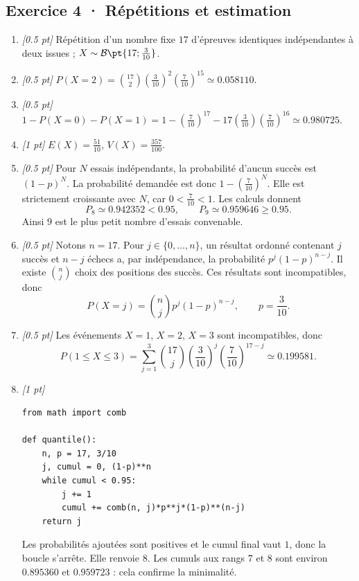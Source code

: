 \subsection*{Exercice 4 · Répétitions et estimation}\begin{enumerate}

\item \textit{[\num{0,5} pt]} Répétition d'un nombre fixe $17$ d'épreuves identiques indépendantes à deux issues ; $X\sim\mathcal B\pt{17;\frac{3}{10}}$.

\item \textit{[\num{0,5} pt]} $P(X=2)=\binom{17}2(\frac{3}{10})^2(\frac{7}{10})^{15}\simeq\num{0,058110}$.

\item \textit{[\num{0,5} pt]} $1-P(X=0)-P(X=1)=1-(\frac{7}{10})^{17}-17(\frac{3}{10})(\frac{7}{10})^{16}\simeq\num{0,980725}$.

\item \textit{[1 pt]} $E(X)=\frac{51}{10}$, $V(X)=\frac{357}{100}$.

\item \textit{[\num{0,5} pt]} Pour $N$ essais indépendants, la probabilité d'aucun succès est $(1-p)^N$. La probabilité demandée est donc $1-(\frac{7}{10})^N$. Elle est strictement croissante avec $N$, car $0<\frac{7}{10}<1$. Les calculs donnent
\[P_{8}\simeq\num{0,942352}<\num{0,95},\qquad P_{9}\simeq\num{0,959646}\ge\num{0,95}.\]
Ainsi $9$ est le plus petit nombre d'essais convenable.

\item \textit{[\num{0,5} pt]} Notons $n=17$. Pour $j\in\{0,\ldots,n\}$, un résultat ordonné contenant $j$ succès et $n-j$ échecs a, par indépendance, la probabilité $p^j(1-p)^{n-j}$. Il existe $\binom nj$ choix des positions des succès. Ces résultats sont incompatibles, donc
\[P(X=j)=\binom nj p^j(1-p)^{n-j},\qquad p=\frac{3}{10}.\]

\item \textit{[\num{0,5} pt]} Les événements $X=1$, $X=2$, $X=3$ sont incompatibles, donc
\[P(1\le X\le3)=\sum_{j=1}^3\binom{17}j(\frac{3}{10})^j(\frac{7}{10})^{17-j}\simeq\num{0,199581}.\]


\item \textit{[1 pt]} 
\begin{lstlisting}
from math import comb

def quantile():
    n, p = 17, 3/10
    j, cumul = 0, (1-p)**n
    while cumul < 0.95:
        j += 1
        cumul += comb(n, j)*p**j*(1-p)**(n-j)
    return j
\end{lstlisting}
Les probabilités ajoutées sont positives et le cumul final vaut $1$, donc la boucle s'arrête. Elle renvoie $8$. Les cumuls aux rangs $7$ et $8$ sont environ $\num{0,895360}$ et $\num{0,959723}$ : cela confirme la minimalité.

\end{enumerate}

